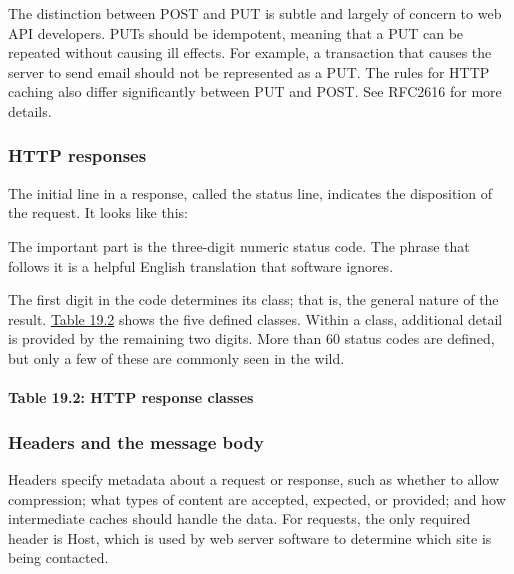 The distinction between POST and PUT is subtle and largely of concern to
web API developers. PUTs should be idempotent, meaning that a PUT can be
repeated without causing ill effects. For example, a transaction that
causes the server to send email should not be represented as a PUT. The
rules for HTTP caching also differ significantly between PUT and POST.
See RFC2616 for more details.

\subsubsection[HTTP
responses]{\texorpdfstring{\protect\hypertarget{part0027_split_003.htmlux5cux23_idTextAnchor1213}{}{}HTTP
responses}{HTTP responses}}

\protect\hypertarget{part0027_split_003.htmlux5cux23_idIndexMarker2761}{}{}The
initial line in a response, called the status line, indicates the
disposition of the request. It looks like this:


The important part is the three-digit numeric status code. The phrase
that follows it is a helpful English translation that software ignores.

The first digit in the code determines its class; that is, the general
nature of the result.
\protect\hyperlink{part0027_split_003.htmlux5cux23_idTextAnchor1214}{Table
19.2} shows the five defined classes. Within a class, additional detail
is provided by the remaining two digits. More than 60 status codes are
defined, but only a few of these are commonly seen in the wild.

\paragraph[{Table 19.2: }HTTP response classes]{\texorpdfstring{{Table
19.2:
}\protect\hypertarget{part0027_split_003.htmlux5cux23_idTextAnchor1214}{}{}HTTP
response classes}{Table 19.2: HTTP response classes}}


\subsubsection[Headers and the message
body]{\texorpdfstring{\protect\hypertarget{part0027_split_003.htmlux5cux23_idTextAnchor1215}{}{}Headers
and the message body}{Headers and the message body}}

Headers specify metadata about a request or response, such as whether to
allow compression; what types of content are accepted, expected, or
provided; and how intermediate caches should handle the data. For
requests, the only required header is Host, which is used by web server
software to determine which site is being contacted.

